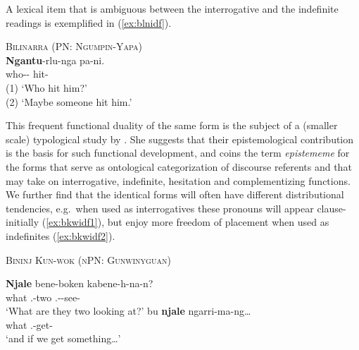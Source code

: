 \documentclass[12pt,egregdoesnotlikesansseriftitles]{scrartcl}
\begin{document}
A lexical item that is ambiguous between the interrogative and the indefinite readings is exemplified in (\ref{ex:blnidf}).

\begin{exe}
  \ex\label{ex:blnidf} \textsc{Bilinarra (PN: Ngumpin-Yapa)}\hfill {}\\
  \gll \textbf{Ngantu}-rlu-nga pa-ni.\\
  who-\Erg-\Dub{} hit-\Pst{}\\
  \glt (1) `Who hit him?'\\
  (2) `Maybe someone hit him.'
\end{exe}

This frequent functional duality of the same form is the subject of a (smaller scale) typological study by \citet{mushin95}. She suggests that their epistemological contribution is the basis for such functional development, and coins the term \textit{epistememe} for the forms that serve as ontological categorization of discourse referents and that may take on interrogative, indefinite, hesitation and complementizing functions. We further find that the identical forms will often have different distributional tendencies, e.g.\ when used as interrogatives these pronouns will appear clause-initially (\ref{ex:bkwidf1}), but enjoy more freedom of placement when used as indefinites (\ref{ex:bkwidf2}).
\begin{exe}
  \ex\label{ex:bkwidf} \textsc{Bininj Kun-wok (nPN: Gunwinyguan)}\hfill {}
  \begin{xlist}
    \ex\gll \textbf{Njale} bene-boken kabene-h-na-n?\\
    what \Third.\Ua-two \Third.\Ua-\Imm-see-\Np\\
    \glt `What are they two looking at?' \label{ex:bkwidf1} %
    \ex\gll bu \textbf{njale} ngarri-ma-ng\ldots\\
    \Sub{} what \First.\Aug-get-\Np\\
    \glt `and if we get something\ldots' \label{ex:bkwidf2}%
  \end{xlist}
\end{exe}
\end{document}
